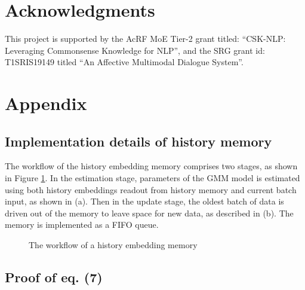 \documentclass[11pt]{article}
\begin{document}
\section*{Acknowledgments}
This project is supported by the AcRF MoE Tier-2 grant titled: ``CSK-NLP: Leveraging Commonsense Knowledge for NLP'', and the SRG grant id: T1SRIS19149 titled ``An Affective Multimodal Dialogue System''.
 






\newpage
\appendix

\section{Appendix}
\label{sec:appendix}
\subsection{Implementation details of history memory}
The workflow of the history embedding memory comprises two stages, as shown in Figure \ref{workflow}. In the estimation stage, parameters of the GMM model is estimated using both history embeddings readout from history memory and current batch input, as shown in (a).
Then in the update stage, the oldest batch of data is driven out of the memory to leave space for new data, as described in (b). 
The memory is implemented as a FIFO queue.

\begin{figure}[ht]

\caption{The workflow of a history embedding memory}
\label{workflow}
\end{figure}

\subsection{Proof of eq. (7)}
\end{document}
